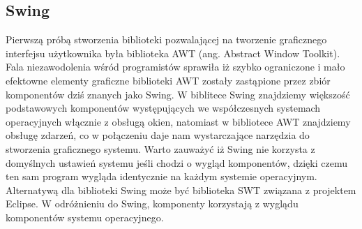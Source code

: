 \begin{par}
	\subsection{Swing}
	Pierwszą próbą stworzenia biblioteki pozwalającej na tworzenie graficznego interfejsu użytkownika była biblioteka AWT (ang. Abstract Window Toolkit).
	Fala niezawodolenia wśród programistów sprawiła iż szybko ograniczone i mało efektowne elementy graficzne biblioteki AWT zostały zastąpione przez zbiór komponentów dziś znanych jako Swing.
	W biblitece Swing znajdziemy większość podstawowych komponentów występujących we współczesnych systemach operacyjnych włącznie z obsługą okien, natomiast w bibliotece AWT znajdziemy obsługę zdarzeń, co w połączeniu daje nam wystarczające narzędzia do stworzenia graficznego systemu.
	Warto zauważyć iż Swing nie korzysta z domyślnych ustawień systemu jeśli chodzi o wygląd komponentów, dzięki czemu ten sam program wygląda identycznie na każdym systemie operacyjnym.
	Alternatywą dla biblioteki Swing może być biblioteka SWT związana z projektem Eclipse.
	W odróżnieniu do Swing, komponenty korzystają z wyglądu komponentów systemu operacyjnego.
\end{par}
